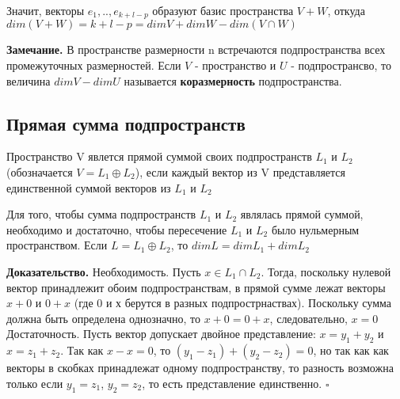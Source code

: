 Значит, векторы $e_1,..,e_{k+l-p}$ образуют базис пространства $V+W$, откуда
$dim(V+W)=k+l-p=dimV+dimW-dim(V\cap W)$

\textbf{Замечание.} В пространстве размерности n встречаются подпространства 
всех промежуточных размерностей. Если $V$ - пространство и $U$ - 
подпространсво, то величина $dimV-dimU$ называется \textbf{коразмерность}
подпространства.

\subsection{Прямая сумма подпространств}
\begin{defin}
Пространство V явлется прямой суммой своих подпространств $L_1$ и $L_2$ 
(обозначается $V=L_1\oplus L_2$), если каждый вектор из V представляется
единственной суммой векторов из $L_1$ и $L_2$
\end{defin}
\begin{theor}
Для того, чтобы сумма подпространств $L_1$ и $L_2$
являлась прямой суммой, необходимо и достаточно, чтобы
пересечение $L_1$ и $L_2$ было нульмерным пространством. Если
$L=L_1\oplus L_2$, то $dimL=dimL_1+dimL_2$
\end{theor}
\textbf{Доказательство.} Необходимость. Пусть $x\in L_1\cap L_2$. Тогда,
поскольку нулевой вектор принадлежит обоим подпространствам, в прямой сумме 
лежат векторы $x+0$ и $0+x$ (где 0 и х берутся в разных подпрострнаствах). 
Поскольку сумма должна быть определена однозначно, то $x+0=0+x$, следовательно,
$x=0$\\
Достаточность. Пусть вектор допускает двойное представление: $x=y_1+y_2$ и
$x=z_1+z_2$. Так как $x-x=0$, то $(y_1-z_1)+(y_2-z_2)=0$, но так как как 
векторы в скобках принадлежат одному подпространству, то разность возможна 
только если $y_1=z_1$, $y_2=z_2$, то есть представление единственно. $\square$

\newpage
